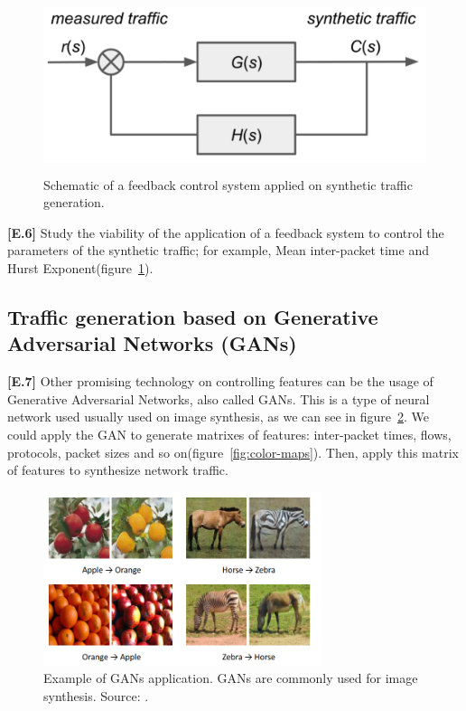 \begin{figure}[!ht]
    \centering
    \includegraphics[height=2.0in]{figures/ch6/control-system}
    \caption{Schematic of a feedback control system applied on synthetic traffic generation.}
    \label{fig:control-system}
\end{figure}

\textbf{[E.6]} Study the viability of the application of a feedback system to control the parameters of the synthetic traffic; for example, Mean inter-packet time and Hurst Exponent(figure~\ref{fig:control-system}).

\subsection{Traffic generation based on Generative Adversarial Networks (GANs)}

\textbf{[E.7]} Other promising technology on controlling features can be the usage of Generative Adversarial Networks, also called GANs\cite{gans-paper}. This is a type of neural network used usually used on image synthesis, as we can see in figure~\ref{fig:gans-example}. We could apply the GAN to generate matrixes of features: inter-packet times, flows, protocols, packet sizes and so on(figure~\ref{fig:color-maps}).  Then, apply this matrix of features to synthesize network traffic. 

\begin{figure}[!ht]
    \centering
    \includegraphics[height=2.0in]{figures/ch6/gans-example}
    \caption{Example of GANs application. GANs are commonly used for image synthesis. Source: \cite{gans-survey}. }
    \label{fig:gans-example}
\end{figure}

